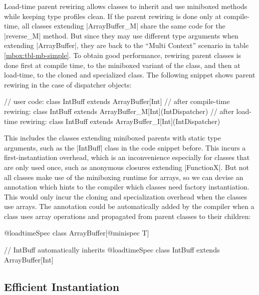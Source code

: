 Load-time parent rewiring allows classes to inherit and use miniboxed methods while keeping type profiles clean. If the parent rewiring is done only at compile-time, all classes extending |ArrayBuffer_M| share the same code for the |reverse_M| method. But since they may use different type arguments when extending |ArrayBuffer|, they are back to the ``Multi Context'' scenario in table \ref{mbox:tbl-mb-simple}. To obtain good performance, rewiring parent classes is done first at compile time, to the miniboxed variant of the class, and then at load-time, to the cloned and specialized class. The following snippet shows parent rewiring in the case of dispatcher objects:  

\begin{lstlisting-nobreak}
 // user code:
 class IntBuff extends ArrayBuffer[Int]
 // after compile-time rewiring:
 class IntBuff extends ArrayBuffer_M[Int](IntDispatcher)
 // after load-time rewiring:
 class IntBuff extends ArrayBuffer_I[Int](IntDispatcher)
\end{lstlisting-nobreak}     

 This includes the classes extending miniboxed parents with static type arguments, such as the |IntBuff| class in the code snippet before. This incurs a first-instantiation overhead, which is an inconvenience especially for classes that are only used once, such as anonymous closures extending |FunctionX|. But not all classes make use of the miniboxing runtime for arrays, so we can devise an annotation which hints to the compiler which classes need factory instantiation. This would only incur the cloning and specialization overhead when the classes use arrays. The annotation could be automatically added by the compiler when a class uses array operations and propagated from parent classes to their children:

\begin{lstlisting-nobreak}
 @loadtimeSpec
 class ArrayBuffer[@minispec T] 

 // IntBuff automatically inherits @loadtimeSpec 
 class IntBuff extends ArrayBuffer[Int]
\end{lstlisting-nobreak}     
    
\subsection{Efficient Instantiation}
\label{mbox:subsec-runtime-instantiation}


